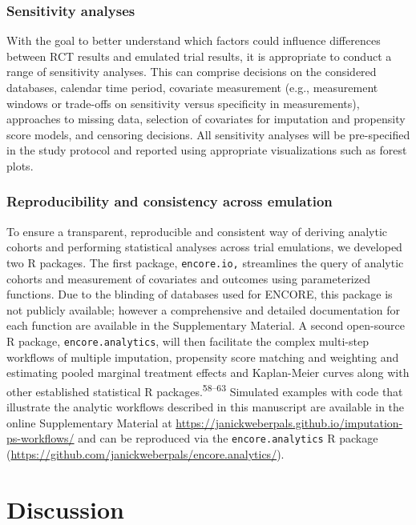 \documentclass[
  letterpaper,
  DIV=11,
  numbers=noendperiod]{scrartcl}
\begin{document}
\subsubsection{Sensitivity analyses}\label{sensitivity-analyses}

With the goal to better understand which factors could influence
differences between RCT results and emulated trial results, it is
appropriate to conduct a range of sensitivity analyses. This can
comprise decisions on the considered databases, calendar time period,
covariate measurement (e.g., measurement windows or trade-offs on
sensitivity versus specificity in measurements), approaches to missing
data, selection of covariates for imputation and propensity score
models, and censoring decisions. All sensitivity analyses will be
pre-specified in the study protocol and reported using appropriate
visualizations such as forest plots.

\subsubsection{Reproducibility and consistency across
emulation}\label{reproducibility-and-consistency-across-emulation}

To ensure a transparent, reproducible and consistent way of deriving
analytic cohorts and performing statistical analyses across trial
emulations, we developed two R packages. The first package,
\texttt{encore.io,} streamlines the query of analytic cohorts and
measurement of covariates and outcomes using parameterized functions.
Due to the blinding of databases used for ENCORE, this package is not
publicly available; however a comprehensive and detailed documentation
for each function are available in the Supplementary Material. A second
open-source R package, \texttt{encore.analytics}, will then facilitate
the complex multi-step workflows of multiple imputation, propensity
score matching and weighting and estimating pooled marginal treatment
effects and Kaplan-Meier curves along with other established statistical
R packages.\textsuperscript{58--63} Simulated examples with code that
illustrate the analytic workflows described in this manuscript are
available in the online Supplementary Material at
\url{https://janickweberpals.github.io/imputation-ps-workflows/} and can
be reproduced via the \texttt{encore.analytics} R package
(\url{https://github.com/janickweberpals/encore.analytics/}).

\newpage{}

\section{Discussion}\label{discussion}
\end{document}

